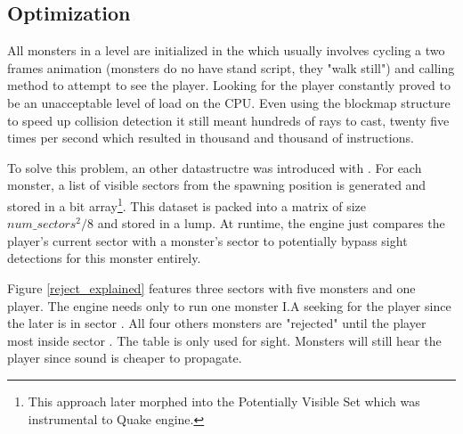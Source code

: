 \subsection{Optimization}
All monsters in a level are initialized in the  which usually involves cycling a two frames animation (monsters do no have stand script, they "walk still") and calling  method to attempt to see the player. Looking for the player constantly proved to be an unacceptable level of load on the CPU. Even using the blockmap structure to speed up collision detection it still meant hundreds of rays to cast, twenty five times per second which resulted in thousand and thousand of instructions.\\
\par
To solve this problem, an other datastructre was introduced with . For each monster, a list of visible sectors from the spawning position is generated and stored in a bit array\footnote{This approach later morphed into the Potentially Visible Set which was instrumental to Quake engine.}. This dataset is packed into a matrix of size $num\_sectors^2/8$ and stored in a  lump. At runtime, the engine just compares the player's current sector with a monster's sector to potentially bypass sight detections for this monster entirely.\\
\par
{}
Figure \ref{reject_explained} features three sectors with five monsters and one player. The engine needs only to run one monster I.A seeking for the player since the later is in sector . All four others monsters are "rejected" until the player most inside sector . The table is only used for sight. Monsters will still hear the player since sound is cheaper to propagate.\\
\par
{}






